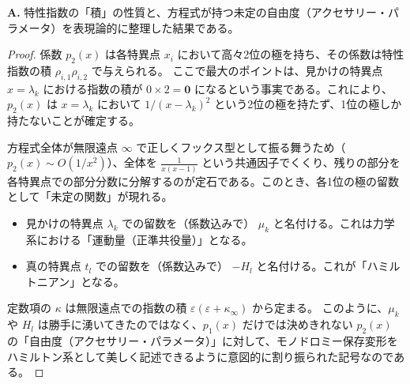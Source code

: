 \begin{Q}
\textbf{A.} 特性指数の「積」の性質と、方程式が持つ未定の自由度（アクセサリー・パラメータ）を表現論的に整理した結果である。

\begin{proof}
係数 $p_2(x)$ は各特異点 $x_i$ において高々2位の極を持ち、その係数は特性指数の積 $\rho_{i,1}\rho_{i,2}$ で与えられる。
ここで最大のポイントは、見かけの特異点 $x=\lambda_k$ における指数の積が $0 \times 2 = \mathbf{0}$ になるという事実である。これにより、$p_2(x)$ は $x=\lambda_k$ において $1/(x-\lambda_k)^2$ という2位の極を持たず、1位の極しか持たないことが確定する。

方程式全体が無限遠点 $\infty$ で正しくフックス型として振る舞うため（$p_2(x) \sim O(1/x^2)$）、全体を $\frac{1}{x(x-1)}$ という共通因子でくくり、残りの部分を各特異点での部分分数に分解するのが定石である。このとき、各1位の極の留数として「未定の関数」が現れる。
\begin{itemize}
    \item 見かけの特異点 $\lambda_k$ での留数を（係数込みで） $\mu_k$ と名付ける。これは力学系における「運動量（正準共役量）」となる。
    \item 真の特異点 $t_l$ での留数を（係数込みで） $-H_l$ と名付ける。これが「ハミルトニアン」となる。
\end{itemize}
定数項の $\kappa$ は無限遠点での指数の積 $\varepsilon(\varepsilon+\kappa_\infty)$ から定まる。
このように、$\mu_k$ や $H_l$ は勝手に湧いてきたのではなく、$p_1(x)$ だけでは決めきれない $p_2(x)$ の「自由度（アクセサリー・パラメータ）」に対して、モノドロミー保存変形をハミルトン系として美しく記述できるように意図的に割り振られた記号なのである。
\end{proof}
\end{Q}

